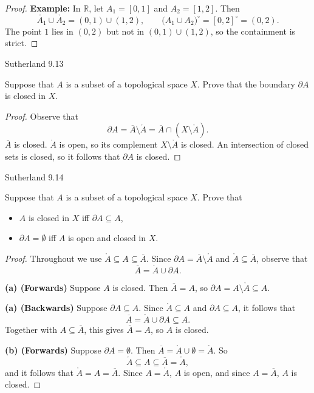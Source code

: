 \documentclass[minion]{homework}
\newcommand{\Reals}{\ensuremath{\mathbb R}}%
\begin{document}
\begin{problems}
\begin{proof}
\textbf{Example:} In $\Reals$, let $A_1 = [0,1]$ and $A_2 = [1,2]$. Then
\[
\mathring{A_1} \cup \mathring{A_2} = (0,1) \cup (1,2), \qquad \big(A_1 \cup A_2\big)^{\circ} = [0,2]^{\circ} = (0,2).
\]
The point $1$ lies in $(0,2)$ but not in $(0,1) \cup (1,2)$, so the containment is strict.
\end{proof}

\problem Sutherland 9.13

Suppose that $A$ is a subset of a topological space $X$. Prove that the boundary $\partial A$ is closed in $X$.

\begin{proof}
Observe that
\[
\partial A = \overline{A} \setminus \mathring{A} = \overline{A} \cap (X \setminus \mathring{A}).
\]
$\overline{A}$ is closed. $\mathring{A}$ is open, so its complement $X \setminus \mathring{A}$ is closed. An intersection of closed sets is closed, so it follows that $\partial A$ is closed.
\end{proof}

\problem Sutherland 9.14

Suppose that $A$ is a subset of a topological space $X$. Prove that
\begin{itemize}
  \item[(a)] $A$ is closed in $X$ iff $\partial A \subseteq A$,
  \item[(b)] $\partial A = \emptyset$ iff $A$ is open and closed in $X$.
\end{itemize}

\begin{proof}
Throughout we use $\mathring{A} \subseteq A \subseteq \overline{A}$. Since $\partial A = \overline{A} \setminus \mathring{A}$ and $\mathring{A} \subseteq \overline{A}$, observe that
\[
\overline{A} = \mathring{A} \cup \partial A.
\]

\textbf{(a) (Forwards)} Suppose $A$ is closed. Then $\overline{A} = A$, so $\partial A = A \setminus \mathring{A} \subseteq A$.

\textbf{(a) (Backwards)} Suppose $\partial A \subseteq A$. Since $\mathring{A} \subseteq A$ and $\partial A \subseteq A$, it follows that
\[
\overline{A} = \mathring{A} \cup \partial A \subseteq A.
\]
Together with $A \subseteq \overline{A}$, this gives $\overline{A} = A$, so $A$ is closed.

\textbf{(b) (Forwards)} Suppose $\partial A = \emptyset$. Then $\overline{A} = \mathring{A} \cup \emptyset = \mathring{A}$. So
\[
\mathring{A} \subseteq A \subseteq \overline{A} = \mathring{A},
\]
and it follows that $\mathring{A} = A = \overline{A}$. Since $A = \mathring{A}$, $A$ is open, and since $A = \overline{A}$, $A$ is closed.


\end{proof}
\end{problems}
\end{document}
